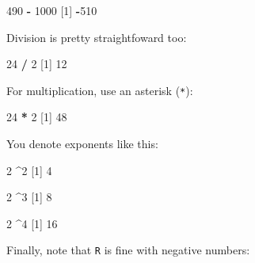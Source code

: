 \documentclass[
]{book}
\newenvironment{Shaded}{\begin{snugshade}}{\end{snugshade}}
\newcommand{\DecValTok}[1]{\textcolor[rgb]{0.00,0.00,0.81}{#1}}
\newcommand{\NormalTok}[1]{#1}
\newcommand{\SpecialCharTok}[1]{\textcolor[rgb]{0.81,0.36,0.00}{\textbf{#1}}}
\begin{document}
\begin{Shaded}
\begin{Highlighting}[]
\DecValTok{490} \SpecialCharTok{{-}} \DecValTok{1000}
\NormalTok{[}\DecValTok{1}\NormalTok{] }\SpecialCharTok{{-}}\DecValTok{510}
\end{Highlighting}
\end{Shaded}

Division is pretty straightfoward too:

\begin{Shaded}
\begin{Highlighting}[]
\DecValTok{24} \SpecialCharTok{/} \DecValTok{2}
\NormalTok{[}\DecValTok{1}\NormalTok{] }\DecValTok{12}
\end{Highlighting}
\end{Shaded}

For multiplication, use an asterisk (\texttt{*}):

\begin{Shaded}
\begin{Highlighting}[]
\DecValTok{24} \SpecialCharTok{*} \DecValTok{2}
\NormalTok{[}\DecValTok{1}\NormalTok{] }\DecValTok{48}
\end{Highlighting}
\end{Shaded}

You denote exponents like this:

\begin{Shaded}
\begin{Highlighting}[]
\DecValTok{2} \SpecialCharTok{\^{}}\DecValTok{2}
\NormalTok{[}\DecValTok{1}\NormalTok{] }\DecValTok{4}
\end{Highlighting}
\end{Shaded}

\begin{Shaded}
\begin{Highlighting}[]
\DecValTok{2} \SpecialCharTok{\^{}}\DecValTok{3}
\NormalTok{[}\DecValTok{1}\NormalTok{] }\DecValTok{8}
\end{Highlighting}
\end{Shaded}

\begin{Shaded}
\begin{Highlighting}[]
\DecValTok{2} \SpecialCharTok{\^{}}\DecValTok{4}
\NormalTok{[}\DecValTok{1}\NormalTok{] }\DecValTok{16}
\end{Highlighting}
\end{Shaded}

Finally, note that \texttt{R} is fine with negative numbers:
\end{document}

